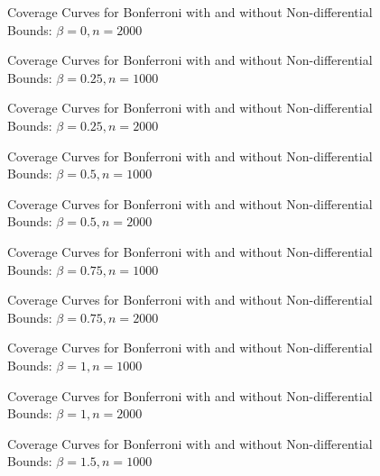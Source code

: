 \begin{figure}
  \centering
  
  \caption{Coverage Curves for Bonferroni with and without Non-differential Bounds:  $\beta = 0, n = 2000$}
\end{figure}
\begin{figure}
  \centering
  
  \caption{Coverage Curves for Bonferroni with and without Non-differential Bounds:  $\beta = 0.25, n = 1000$}
\end{figure}

\begin{figure}
  \centering
  
  \caption{Coverage Curves for Bonferroni with and without Non-differential Bounds:  $\beta = 0.25, n = 2000$}
\end{figure}

\begin{figure}
  \centering
  
  \caption{Coverage Curves for Bonferroni with and without Non-differential Bounds:  $\beta = 0.5, n = 1000$}
\end{figure}

\begin{figure}
  \centering
  
  \caption{Coverage Curves for Bonferroni with and without Non-differential Bounds: $\beta = 0.5, n = 2000$}
\end{figure}
\begin{figure}
  \centering
  
  \caption{Coverage Curves for Bonferroni with and without Non-differential Bounds:  $\beta = 0.75, n = 1000$}
\end{figure}

\begin{figure}
  \centering
  
  \caption{Coverage Curves for Bonferroni with and without Non-differential Bounds:  $\beta = 0.75, n = 2000$}
\end{figure}
\begin{figure}
  \centering
  
  \caption{Coverage Curves for Bonferroni with and without Non-differential Bounds:  $\beta = 1, n = 1000$}
\end{figure}

\begin{figure}
  \centering
  
  \caption{Coverage Curves for Bonferroni with and without Non-differential Bounds:   $\beta = 1, n = 2000$}
\end{figure}
\begin{figure}
  \centering
  
  \caption{Coverage Curves for Bonferroni with and without Non-differential Bounds:  $\beta = 1.5, n = 1000$}
\end{figure}

